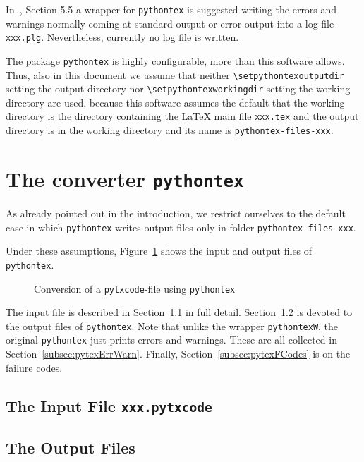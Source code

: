 \documentclass[10pt]{article}
\newcommand{\pytex}{\texttt{pythontex}}
\newcommand{\Ppytex}{package \texttt{pythontex}}
\newcommand{\cmd}[1]{\texttt{\textbackslash#1}}
\begin{document}
In~\cite{LatexPlugin}, Section 5.5 a wrapper for \pytex{} is suggested 
writing the errors and warnings normally coming at standard output or error output into a log file \texttt{xxx.plg}. 
Nevertheless, currently no log file is written. 

The \Ppytex{} is highly configurable, 
more than this software allows. 
Thus, also in this document 
we assume that neither \cmd{setpythontexoutputdir} setting the output directory 
nor \cmd{setpythontexworkingdir} setting the working directory are used, 
because this software assumes the default that the working directory is the directory 
containing the \LaTeX{} main file \texttt{xxx.tex}
and the output directory is in the working directory 
and its name is \texttt{pythontex-files-xxx}. 


\section{The converter \pytex}\label{sec:pytex}

As already pointed out in the introduction, 
we restrict ourselves to the default case 
in which \pytex{} writes output files only in folder \texttt{pythontex-files-xxx}. 

Under these assumptions, Figure~\ref{fig:py2dir} shows the input and output files of \pytex{}. 

\begin{figure}[htb]
  \centering
  \caption{\label{fig:py2dir}Conversion of a \texttt{pytxcode}-file using \texttt{pythontex}}
  \end{figure}

  The input file is described in Section~\ref{subsec:pytexInFile} in full detail. 
  Section~\ref{subsec:pytexOutFile} is devoted to the output files of \pytex{}. 
  Note that unlike the wrapper \texttt{pythontexW}, the original \pytex{} 
  just prints errors and warnings. 
  These are all collected in Section~\ref{subsec:pytexErrWarn}. 
  Finally, Section~\ref{subsec:pytexFCodes} is on the failure codes. 

\subsection{The Input File \texttt{xxx.pytxcode}}\label{subsec:pytexInFile}

\subsection{The Output Files}\label{subsec:pytexOutFile}
\end{document}
